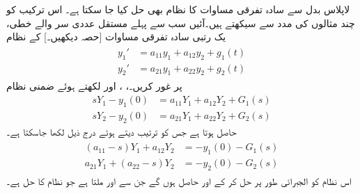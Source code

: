 لاپلاس بدل سے سادہ تفرقی مساوات کا نظام بھی حل کیا جا سکتا ہے۔ اس ترکیب کو چند مثالوں کی مدد سے سیکھتے ہیں۔آئیں سب سے پہلے مستقل عددی سر والے خطی، یک رتبی سادہ تفرقی مساوات [حصہ  دیکھیں۔] کے نظام
\begin{gather}
\begin{aligned}\label{مساوات_لاپلاس_نظام_خطی_ایک_درجی_الف}
y_1'&=a_{11}y_1+a_{12}y_2+g_1(t)\\
y_2'&=a_{21}y_1+a_{22}y_2+g_2(t)
\end{aligned}
\end{gather}
پر غور کریں۔، ،  اور  لکھتے ہوئے ضمنی نظام
\begin{align*}
sY_1-y_1(0)&=a_{11}Y_1+a_{12}Y_2+G_1(s)\\
sY_2-y_2(0)&=a_{21}Y_1+a_{22}Y_2+G_2(s)
\end{align*}
حاصل ہوتا ہے جس کو ترتیب دیتے ہوئے  درج ذیل لکھا جاسکتا ہے۔
 \begin{gather}
\begin{aligned}\label{مساوات_لاپلاس_نظام_خطی_ایک_درجی_ب}
(a_{11}-s)Y_1+a_{12}Y_2&=-y_1(0)-G_1(s)\\
a_{21}Y_1+(a_{22}-s)Y_2&=-y_2(0)-G_2(s)
\end{aligned}
\end{gather}
اس نظام کو الجبرائی طور پر حل کر کے  اور  حاصل ہوں گے جن سے  اور   ملتا ہے جو نظام کا حل ہے۔

